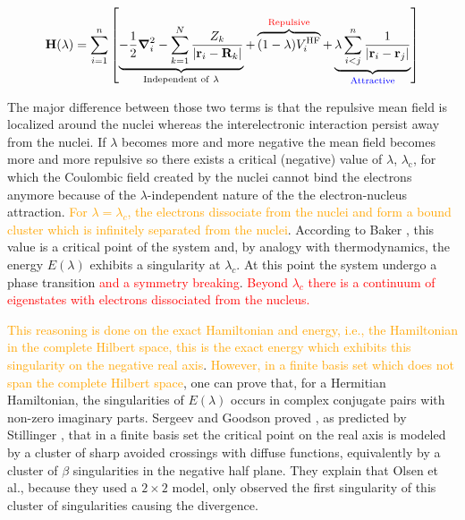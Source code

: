\documentclass[11pt,a4paper]{article}
\newcommand{\titou}[1]{\textcolor{red}{#1}}
\newcommand{\antoine}[1]{\textcolor{orange}{#1}}
\newcommand{\bH}{\mathbf{H}}
\begin{document}
\begin{equation}\label{eq:HamiltonianStillinger}
    \bH(\lambda)=\sum\limits_{i=1}^{n}\left[ \underbrace{-\frac{1}{2}\grad_i^2 - \sum\limits_{k=1}^{N} \frac{Z_k}{|\vb{r}_i-\vb{R}_k|}}_{\text{Independent of}~\lambda} + \overbrace{(1-\lambda)V_i^{\text{HF}}}^{\textcolor{red}{\text{Repulsive}}}+\underbrace{\lambda\sum\limits_{i<j}^{n}\frac{1}{|\vb{r}_i-\vb{r}_j|}}_{\textcolor{blue}{\text{Attractive}}}  \right]
\end{equation}

The major difference between those two terms is that the repulsive mean field is localized around the nuclei whereas the interelectronic interaction persist away from the nuclei. If $\lambda$ becomes more and more negative the mean field becomes more and more repulsive so there exists a critical (negative) value of $\lambda$, $\lambda_\text{c}$, for which the Coulombic field created by the nuclei cannot bind the electrons anymore because of the $\lambda$-independent nature of the the electron-nucleus attraction. \antoine{For $\lambda = \lambda_c$, the electrons dissociate from the nuclei and form a bound cluster which is infinitely separated from the nuclei}. According to Baker \cite{Baker_1971}, this value is a critical point of the system and, by analogy with thermodynamics, the energy $E(\lambda)$ exhibits a singularity at $\lambda_c$. At this point the system undergo a phase transition \titou{and a symmetry breaking}. \titou{Beyond $\lambda_c$ there is a continuum of eigenstates with electrons dissociated from the nucleus.}

\antoine{This reasoning is done on the exact Hamiltonian and energy, i.e., the Hamiltonian in the complete Hilbert space, this is the exact energy which exhibits this singularity on the negative real axis}. \antoine{However, in a finite basis set which does not span the complete Hilbert space}, one can prove that, for a Hermitian Hamiltonian, the singularities of $E(\lambda)$ occurs in complex conjugate pairs with non-zero imaginary parts. Sergeev and Goodson proved \cite{Sergeev_2005}, as predicted by Stillinger \cite{Stillinger_2000}, that in a finite basis set the critical point on the real axis is modeled by a cluster of sharp avoided crossings with diffuse functions, equivalently by a cluster of $\beta$ singularities in the negative half plane. They explain that Olsen et al., because they used a $2\times2$ model, only observed the first singularity of this cluster of singularities causing the divergence.
\end{document}
